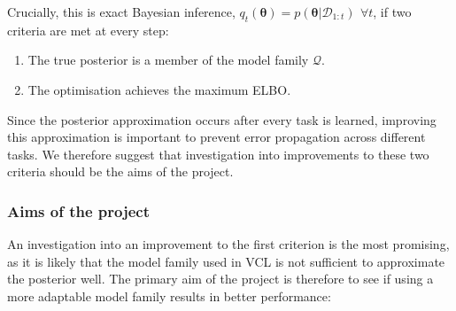 \documentclass[a4paper,10pt]{article}
\let\boldtheta\theta %
\renewcommand{\theta}{\boldsymbol{\boldtheta}} %
\begin{document}
\vspace{-0.8em}
Crucially, this is exact Bayesian inference, $q_t(\theta)=p(\theta | \mathcal{D}_{1:t}) \>\, \forall t$, if two criteria are met at every step:

\begin{enumerate}
\item The true posterior is a member of the model family $\mathcal{Q}$.
\vspace{-0.2em}
\item The optimisation achieves the maximum ELBO.

\end{enumerate}

Since the posterior approximation occurs after every task is learned, improving this approximation is important to prevent error propagation across different tasks. We therefore suggest that investigation into improvements to these two criteria should be the aims of the project.

\vspace{-1em}
\subsubsection*{Aims of the project}

\vspace{-1em}
An investigation into an improvement to the first criterion is the most promising, as it is likely that the model family used in VCL is not sufficient to approximate the posterior well. The primary aim of the project is therefore to see if using a more adaptable model family results in better performance:
\end{document}
